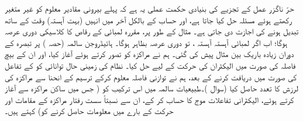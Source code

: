  حرّ ناگزر عمل کے تجزیے کی بنیادی حکمت عملی یہ ہے کہ پہلے بیرونی مقادیر معلوم کو غیر متغیر رکھتے ہوئے مسئلہ حل کیا جاتا ہے، اور حساب کے بالکل آخر میں انہیں (بہت آہستہ) وقت کے ساتھ تبدیل ہونے کی اجازت دی جاتی ہے۔ مثال کے طور پر، مقررہ لمبائی  کے رقاص کا کلاسیکی دوری عرصہ  ہوگا؛ اب اگر لمبائی آہستہ آہستہ ، تو دوری عرصہ بظاہر  ہوگا۔ ہائیڈروجن سالمہ (حصہ ) پر تبصرہ کے دوران زیادہ باریک بین مثال پیش کی گئی۔ ہم نے مراکزہ کو  تصور کرتے ہوئے آغاز کیا، اور ان کے بیچ فاصلہ  کی صورت میں الیکٹران کی حرکت کے لیے حل کیا۔ نظام کی زمینی حال توانائی کو  کے تفاعل کی صورت میں دریافت کرنے کے بعد، ہم نے توازنی فاصلہ معلوم کرکے ترسیم کے انحنا سے مراکزہ کی لرزش کا تعدد حاصل کیا (سوال )۔طبیعیات سالمہ میں اس ترکیب کو ( جس میں ساکن مراکزہ سے آغاز کرتے ہوئے، الیکٹرانی تفاعلات موج کا حساب کر کے، ان سے نسبتاً سست رفتار مراکزہ کے مقامات اور حرکت کے بارے میں معلومات حاصل کرنے کو)  کہتے ہیں۔
 
